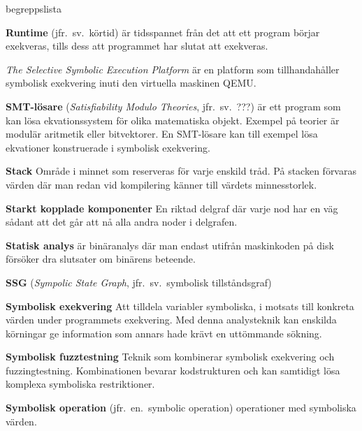 \begin{labeling}{begreppslista}
    \item [\textbf{Runtime}] (jfr.\ sv.\ körtid) är tidsspannet från det att ett
    program börjar exekveras, tills dess att programmet har slutat att
    exekveras.

    \item [\textbf{\stoe}] \emph{The Selective Symbolic Execution Platform} är
    en platform som tillhandahåller symbolisk exekvering inuti den virtuella
    maskinen QEMU.\@

    \item [\textbf{SMT-lösare}] (\emph{Satisfiability Modulo Theories}, jfr.\
          sv.\ ???) är ett program som kan lösa ekvationssystem för olika matematiska
    objekt.  Exempel på teorier är modulär aritmetik eller bitvektorer. En
    SMT-lösare kan till exempel lösa ekvationer konstruerade i symbolisk
    exekvering.

    \item [\textbf{Stack}] Område i minnet som reserveras för varje enskild
    tråd.  På stacken förvaras värden där man redan vid kompilering känner till
    värdets minnesstorlek.

    \item [\textbf{Starkt kopplade komponenter}] En riktad delgraf där varje nod
    har en väg sådant att det går att nå alla andra noder i delgrafen.

    \item [\textbf{Statisk analys}] är binäranalys där man endast utifrån
    maskinkoden på disk försöker dra slutsater om binärens beteende.

    \item [\textbf{SSG}] (\emph{Sympolic State Graph}, jfr.\ sv.\ symbolisk
          tillståndsgraf)

    \item [\textbf{Symbolisk exekvering}] Att tilldela variabler symboliska, i
    motsats till konkreta värden under programmets exekvering. Med denna
    analysteknik kan enskilda körningar ge information som annars hade krävt en
    uttömmande sökning.

    \item [\textbf{Symbolisk fuzztestning}] Teknik som kombinerar symbolisk
    exekvering och fuzzingtestning. Kombinationen bevarar kodstrukturen och kan
    samtidigt lösa komplexa symboliska restriktioner.

    \item [\textbf{Symbolisk operation}] (jfr.\ en.\ symbolic operation)
    operationer med symboliska värden.


\end{labeling}
